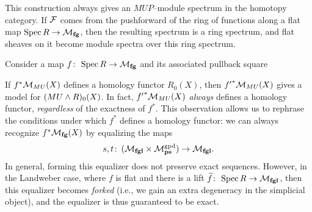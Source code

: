 \begin{remark}
This construction always gives an \(MUP\)--module spectrum in the homotopy category.  If \(\mathcal{F}\) comes from the pushforward of the ring of functions along a flat map \(\operatorname{Spec} R \to \mathcal{M}_{\mathbf{fg}}\), then the resulting spectrum is a ring spectrum, and flat sheaves on it become module spectra over this ring spectrum.
\end{remark}

\begin{remark}\label{PullingBackOverMfgVsMfgl}
Consider a map \(f\colon\thinspace \operatorname{Spec} R \to \mathcal{M}_{\mathbf{fg}}\) and its associated pullback square
\begin{center}
\end{center}
If \(f^* \mathcal{M}_{MU}(X)\) defines a homology functor \(R_0(X)\), then \({f'}^* \mathcal{M}_{MU}(X)\) gives a model for \((MU \wedge R)_0(X)\).  In fact, \({f'}^* \mathcal{M}_{MU}(X)\) \emph{always} defines a homology functor, \emph{regardless} of the exactness of \(f^*\).  This observation allows us to rephrase the conditions under which \(f^*\) defines a homology functor: we can always recognize \(f^* \mathcal{M}_{\mathbf{fg}}(X)\) by equalizing the maps \[s, t\colon\thinspace (\mathcal{M}_{\mathbf{fgl}} \times \mathcal{M}_{\mathbf{ps}}^{\mathrm{gpd}}) \to \mathcal{M}_{\mathbf{fgl}}.\]  In general, forming this equalizer does not preserve exact sequences.  However, in the Landweber case, where \(f\) is flat and there is a lift \(\widetilde f\colon\thinspace \operatorname{Spec} R \to \mathcal{M}_{\mathbf{fgl}}\), then this equalizer becomes \emph{forked} (i.e., we gain an extra degeneracy in the simplicial object), and the equalizer is thus guaranteed to be exact.
\end{remark}

